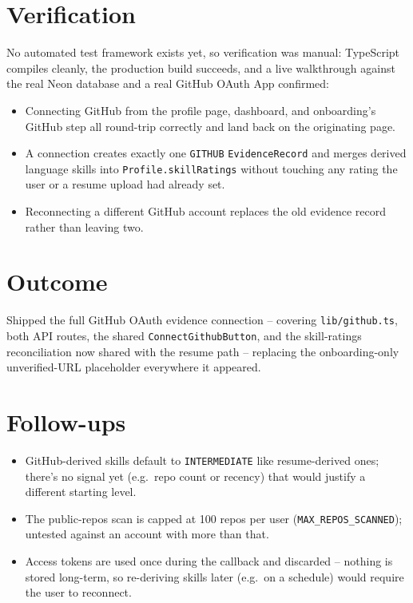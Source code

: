 \documentclass[11pt,a4paper]{article}
\begin{document}
\section{Verification}
No automated test framework exists yet, so verification was
manual: TypeScript compiles cleanly, the production build
succeeds, and a live walkthrough against the real Neon database
and a real GitHub OAuth App confirmed:
\begin{itemize}[leftmargin=0.7cm]
  \item Connecting GitHub from the profile page, dashboard, and
    onboarding's GitHub step all round-trip correctly and land
    back on the originating page.
  \item A connection creates exactly one \texttt{GITHUB}
    \texttt{EvidenceRecord} and merges derived language skills into
    \texttt{Profile.skillRatings} without touching any rating the
    user or a resume upload had already set.
  \item Reconnecting a different GitHub account replaces the old
    evidence record rather than leaving two.
\end{itemize}

\section{Outcome}
Shipped the full GitHub OAuth evidence connection -- covering
\texttt{lib/github.ts}, both API routes, the shared
\texttt{ConnectGithubButton}, and the skill-ratings reconciliation
now shared with the resume path -- replacing the onboarding-only
unverified-URL placeholder everywhere it appeared.

\section{Follow-ups}
\begin{itemize}[leftmargin=0.7cm]
  \item GitHub-derived skills default to \texttt{INTERMEDIATE}
    like resume-derived ones; there's no signal yet (e.g.\ repo
    count or recency) that would justify a different starting
    level.
  \item The public-repos scan is capped at 100 repos per user
    (\texttt{MAX\_REPOS\_SCANNED}); untested against an account
    with more than that.
  \item Access tokens are used once during the callback and
    discarded -- nothing is stored long-term, so re-deriving skills
    later (e.g.\ on a schedule) would require the user to
    reconnect.
\end{itemize}
\end{document}
